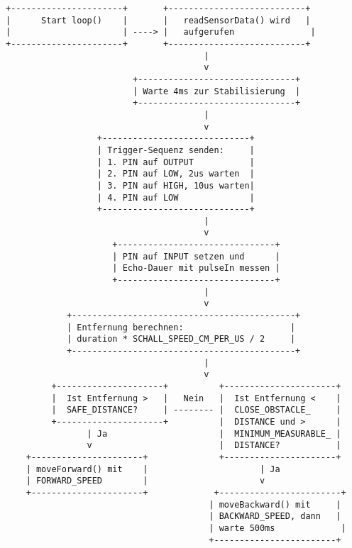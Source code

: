 \documentclass{vorlage-design-main}
\begin{document}
\begin{lstlisting}
+----------------------+       +---------------------------+
|      Start loop()    |       |   readSensorData() wird   |
|                      | ----> |   aufgerufen               |
+----------------------+       +---------------------------+
                                       |
                                       v
                         +-------------------------------+
                         | Warte 4ms zur Stabilisierung  |
                         +-------------------------------+
                                       |
                                       v
                  +-----------------------------+  
                  | Trigger-Sequenz senden:     |
                  | 1. PIN auf OUTPUT           |
                  | 2. PIN auf LOW, 2us warten  |
                  | 3. PIN auf HIGH, 10us warten|
                  | 4. PIN auf LOW              |
                  +-----------------------------+
                                       |
                                       v
                     +-------------------------------+
                     | PIN auf INPUT setzen und      |
                     | Echo-Dauer mit pulseIn messen |
                     +-------------------------------+
                                       |
                                       v
            +--------------------------------------------+
            | Entfernung berechnen:                     |
            | duration * SCHALL_SPEED_CM_PER_US / 2     |
            +--------------------------------------------+
                                       |
                                       v
         +---------------------+          +----------------------+
         |  Ist Entfernung >   |   Nein   |  Ist Entfernung <    |
         |  SAFE_DISTANCE?     | -------- |  CLOSE_OBSTACLE_     |
         +---------------------+          |  DISTANCE und >      |
                | Ja                      |  MINIMUM_MEASURABLE_ |
                v                         |  DISTANCE?           |
    +----------------------+              +----------------------+
    | moveForward() mit    |                      | Ja
    | FORWARD_SPEED        |                      v
    +----------------------+             +------------------------+
                                        | moveBackward() mit     |
                                        | BACKWARD_SPEED, dann   |
                                        | warte 500ms             |
                                        +------------------------+

\end{lstlisting}
\end{document}
